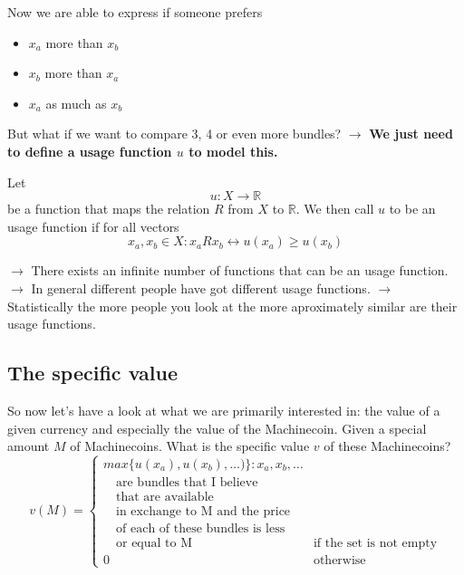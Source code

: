 \documentclass{beamer}
\begin{document}
\frame
{
  Now we are able to express if someone prefers 
  \begin{itemize}
  \item $x_{a}$ more than $x_{b}$ 
  \item $x_{b}$ more than $x_{a}$  
  \item $x_{a}$ as much as $x_{b}$ 
  \end{itemize}
  But what if we want to compare 3, 4 or even more bundles?
  \newline
  $\rightarrow$ \textbf{We just need to define a usage function $u$ to model this.}
}
\frame
{
 \begin{definition}
   Let 
   $$u:X\rightarrow \mathbb{R}$$
   be a function that maps the relation $R$ from $X$ to $\mathbb{R}$. We then call $u$ to be an usage function if for all vectors 
   $$x_{a}, x_{b} \in X : x_{a}Rx_{b} \leftrightarrow u(x_{a}) \geq u(x_{b})$$
 \end{definition}
 $\rightarrow$ There exists an infinite number of functions that can be an usage function. 
 \newline
 $\rightarrow$ In general different people have got different usage functions.
 \newline
  $\rightarrow$ Statistically the more people you look at the more aproximately similar are their usage functions. 
    
}
\subsection{The specific value}
\frame
{
  So now let's have a look at what we are primarily interested in: the value of a given currency and especially the value of the Machinecoin. Given a special amount $M$ of Machinecoins. What is the specific value $v$ of these Machinecoins?
 $$v(M)=\begin{cases}max\{u(x_{a}), u(x_{b}), \dots)\}:x_{a}, x_{b}, \dots \\ \quad  \text{are bundles that I believe}\\ \quad \text{that are available} \\ \quad \text{in exchange to M and the price}\\ \quad \text{of each of these bundles is less}\\ \quad  \text{or equal to M} &\text{if the set is not empty}\\0&\text{otherwise}\end{cases}$$
}
\end{document}
